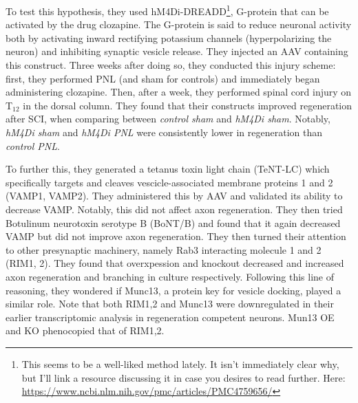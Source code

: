 To test this hypothesis, they used hM4Di-DREADD\footnote{This seems to be a well-liked method lately. It isn't immediately clear why, but I'll link a resource discussing it in case you desires to read further. Here: \url{https://www.ncbi.nlm.nih.gov/pmc/articles/PMC4759656/}}, G-protein that can be activated by the drug clozapine. The G-protein is said to reduce neuronal activity both by activating inward rectifying potassium channels (hyperpolarizing the neuron) and inhibiting synaptic vesicle release. They injected an AAV containing this construct. Three weeks after doing so, they conducted this injury scheme: first, they performed PNL (and sham for controls) and immediately began administering clozapine. Then, after a week, they performed spinal cord injury on T$_{12}$ in the dorsal column. They found that their constructs improved regeneration after SCI, when comparing between \textit{control sham} and \textit{hM4Di sham}. Notably, \textit{hM4Di sham} and \textit{hM4Di PNL} were consistently lower in regeneration than \textit{control PNL}.\newline

To further this, they generated a tetanus toxin light chain (TeNT-LC) which specifically targets and cleaves vescicle-associated membrane proteins 1 and 2 (VAMP1, VAMP2). They administered this by AAV and validated its ability to decrease VAMP. Notably, this did not affect axon regeneration. They then tried Botulinum neurotoxin serotype B (BoNT/B) and found that it again decreased VAMP but did not improve axon regeneration. They then turned their attention to other presynaptic machinery, namely Rab3 interacting molecule 1 and 2 (RIM1, 2). They found that overxpession and knockout decreased and increased axon regeneration and branching in culture respectively. Following this line of reasoning, they wondered if Munc13, a protein key for vesicle docking, played a similar role. Note that both RIM1,2 and Munc13 were downregulated in their earlier transcriptomic analysis in regeneration competent neurons. Mun13 OE and KO phenocopied that of RIM1,2.\newline

